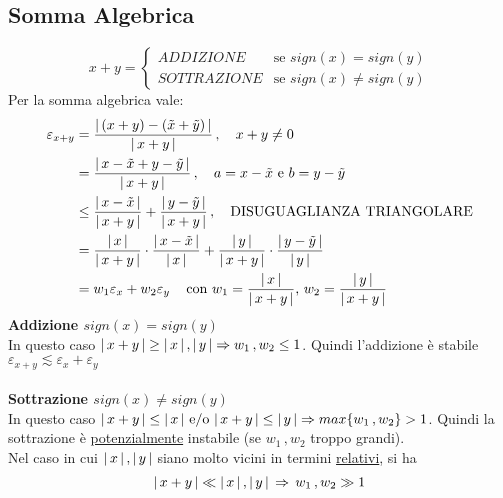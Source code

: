 \subsection{Somma Algebrica}
\[x+y = 
\begin{cases}
ADDIZIONE & \text{se $sign(x)=sign(y)$} \\
SOTTRAZIONE & \text{se $sign(x) \ne sign(y)$}
\end{cases}
\]
Per la somma algebrica vale:
\[\begin{split}
\varepsilon_{x+y} & = \frac{\abs*{\,(x + y) - (\Tilde{x} + \Tilde{y})\,}}{\abs*{\,x + y\,}} \,, \quad x + y \ne 0 \\
& = \frac{\abs*{\,x - \Tilde{x} + y - \Tilde{y}\,}}{\abs*{\,x + y\,}} \,, \quad a = x - \Tilde{x} \text{ e } b = y - \Tilde{y} \\
& \le \frac{\abs*{\,x - \Tilde{x}\,}}{\abs*{\,x + y\,}} + \frac{\abs*{\,y - \Tilde{y}\,}}{\abs*{\,x + y\,}} \,, \quad \text{DISUGUAGLIANZA TRIANGOLARE} \\
& = \frac{\abs*{\,x\,}}{\abs*{\,x + y\,}} \cdot \frac{\abs*{\,x - \Tilde{x}\,}}{\abs*{\,x\,}} + \frac{\abs*{\,y\,}}{\abs*{\,x + y\,}} \cdot \frac{\abs*{\,y - \Tilde{y}\,}}{\abs*{\,y\,}} \\
& = w_1 \varepsilon_x + w_2 \varepsilon_y \, \quad \text{con $w_1=\frac{\abs*{\,x\,}}{\abs*{\,x + y\,}}$, $w_2=\frac{\abs*{\,y\,}}{\abs*{\,x + y\,}}$}
\end{split}\]
\textbf{Addizione $sign(x)=sign(y)$}\\
In questo caso $\abs*{\,x + y\,} \ge \abs*{\,x\,}\,,\abs*{\,y\,} \Rightarrow w_1\,,w_2 \le 1$. Quindi l'addizione è stabile $\varepsilon_{x+y}\lesssim \varepsilon_x+\varepsilon_y$
\\\\\textbf{Sottrazione $sign(x)\ne sign(y)$}\\
In questo caso $\abs*{\,x + y\,} \le \abs*{\,x\,} \text{ e/o } \abs*{\,x + y\,} \le \abs*{\,y\,} \Rightarrow max\{w_1\,,w_2\} > 1$. Quindi la sottrazione è \underline{potenzialmente} instabile (se $w_1\,,w_2$ troppo grandi).\\
Nel caso in cui $\abs*{\,x\,}\,,\abs*{\,y\,}$ siano molto vicini in termini \underline{relativi}, si ha
\[
\abs*{\,x + y\,} \ll \abs*{\,x\,}\,,\abs*{\,y\,} \, \Rightarrow \, w_1\,,w_2 \gg 1
\]

